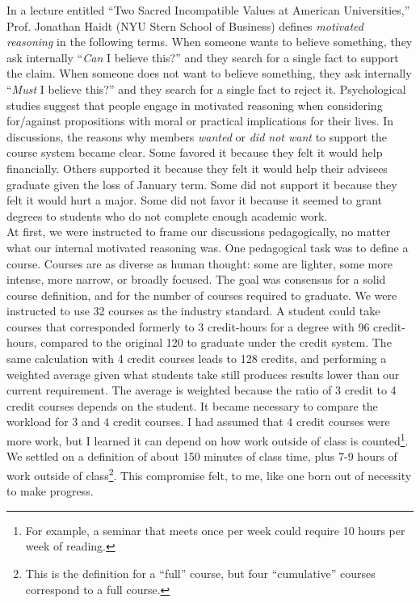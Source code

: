 \documentclass[../../../main.tex]{subfiles}
\begin{document}
In a lecture entitled ``Two Sacred Incompatible Values at American Universities,'' \cite{haidt} Prof. Jonathan Haidt (NYU Stern School of Business) defines \textit{motivated reasoning} in the following terms.  When someone wants to believe something, they ask internally ``\textit{Can} I believe this?'' and they search for a single fact to support the claim.  When someone does not want to believe something, they ask internally ``\textit{Must} I believe this?'' and they search for a single fact to reject it.  Psychological studies suggest that people engage in motivated reasoning when considering for/against propositions with moral or practical implications for their lives.  In discussions, the reasons why members \textit{wanted} or \textit{did not want} to support the course system became clear.  Some favored it because they felt it would help financially.  Others supported it because they felt it would help their advisees graduate given the loss of January term.  Some did not support it because they felt it would hurt a major.  Some did not favor it because it seemed to grant degrees to students who do not complete enough academic work.  
\\
\vspace{0.25cm}
At first, we were instructed to frame our discussions pedagogically, no matter what our internal motivated reasoning was.  One pedagogical task was to define a course.  Courses are as diverse as human thought: some are lighter, some more intense, more narrow, or broadly focused.  The goal was consensus for a solid course definition, and for the number of courses required to graduate.  We were instructed to use 32 courses as the industry standard.  A student could take courses that corresponded formerly to 3 credit-hours for a degree with 96 credit-hours, compared to the original 120 to graduate under the credit system.  The same calculation with 4 credit courses leads to 128 credits, and performing a weighted average given what students take still produces results lower than our current requirement.  The average is weighted because the ratio of 3 credit to 4 credit courses depends on the student.  It became necessary to compare the workload for 3 and 4 credit courses.  I had assumed that 4 credit courses were more work, but I learned it can depend on how work outside of class is counted\footnote{For example, a seminar that meets once per week could require 10 hours per week of reading.}.  We settled on a definition of about 150 minutes of class time, plus 7-9 hours of work outside of class\footnote{This is the definition for a ``full'' course, but four ``cumulative'' courses correspond to a full course.}.  This compromise felt, to me, like one born out of necessity to make progress.
\end{document}
